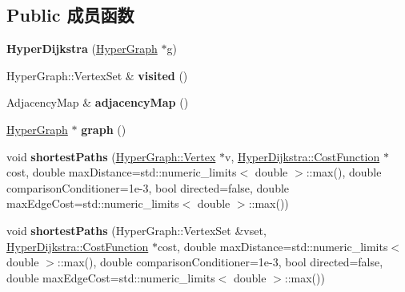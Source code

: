 \subsection*{Public 成员函数}
\begin{DoxyCompactItemize}
\item 
\hypertarget{structg2o_1_1HyperDijkstra_a55e844f4b596290cb36a0d9fe4140966}{{\bfseries Hyper\-Dijkstra} (\hyperlink{classg2o_1_1HyperGraph}{Hyper\-Graph} $\ast$g)}\label{structg2o_1_1HyperDijkstra_a55e844f4b596290cb36a0d9fe4140966}

\item 
\hypertarget{structg2o_1_1HyperDijkstra_a2cb453ed6f1bf6069186bd269a6464da}{Hyper\-Graph\-::\-Vertex\-Set \& {\bfseries visited} ()}\label{structg2o_1_1HyperDijkstra_a2cb453ed6f1bf6069186bd269a6464da}

\item 
\hypertarget{structg2o_1_1HyperDijkstra_ace002e09514a2eeb76a7b569f9e30f6c}{Adjacency\-Map \& {\bfseries adjacency\-Map} ()}\label{structg2o_1_1HyperDijkstra_ace002e09514a2eeb76a7b569f9e30f6c}

\item 
\hypertarget{structg2o_1_1HyperDijkstra_a578a9eb1874d9802dbd37a2f1681c196}{\hyperlink{classg2o_1_1HyperGraph}{Hyper\-Graph} $\ast$ {\bfseries graph} ()}\label{structg2o_1_1HyperDijkstra_a578a9eb1874d9802dbd37a2f1681c196}

\item 
\hypertarget{structg2o_1_1HyperDijkstra_ad88b79c73c8eaa5f1afbe27b778b542e}{void {\bfseries shortest\-Paths} (\hyperlink{classg2o_1_1HyperGraph_1_1Vertex}{Hyper\-Graph\-::\-Vertex} $\ast$v, \hyperlink{structg2o_1_1HyperDijkstra_1_1CostFunction}{Hyper\-Dijkstra\-::\-Cost\-Function} $\ast$cost, double max\-Distance=std\-::numeric\-\_\-limits$<$ double $>$\-::max(), double comparison\-Conditioner=1e-\/3, bool directed=false, double max\-Edge\-Cost=std\-::numeric\-\_\-limits$<$ double $>$\-::max())}\label{structg2o_1_1HyperDijkstra_ad88b79c73c8eaa5f1afbe27b778b542e}

\item 
\hypertarget{structg2o_1_1HyperDijkstra_a00d978615ff1bbb9917351e9cba0b4ba}{void {\bfseries shortest\-Paths} (Hyper\-Graph\-::\-Vertex\-Set \&vset, \hyperlink{structg2o_1_1HyperDijkstra_1_1CostFunction}{Hyper\-Dijkstra\-::\-Cost\-Function} $\ast$cost, double max\-Distance=std\-::numeric\-\_\-limits$<$ double $>$\-::max(), double comparison\-Conditioner=1e-\/3, bool directed=false, double max\-Edge\-Cost=std\-::numeric\-\_\-limits$<$ double $>$\-::max())}\label{structg2o_1_1HyperDijkstra_a00d978615ff1bbb9917351e9cba0b4ba}

\end{DoxyCompactItemize}
